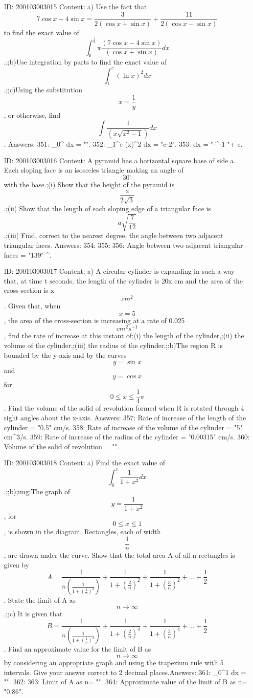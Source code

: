 \documentclass{article}
\begin{document}
ID: 200103003015
Content:
a) Use the fact that $$7\cos x - 4\sin x = \frac{3}{2( \cos x + \sin x )} + \frac{11}{2( \cos x - \sin x )}$$ to find the exact value of  $$\int_0^\frac{1}{2}\pi \frac{(7\cos x - 4\sin x)}{(\cos x + \sin x)} dx$$.;;b)Use integration by parts to find the exact value of $$\int_1^e  (\ln x) ^2 dx $$.;;c)Using the substitution  $$x = \frac{1}{y}$$, or otherwise, find $$\int \frac{1}{(x\sqrt {x^2  - 1})}dx $$. Answers:
351: \int_0^{}  dx = "".
352: \int_1^e (\ln x)^2 dx = "e-2".
353: \int {} dx = "-\sin^{-1} {}"+ c.

ID: 200103003016
Content:
A pyramid has a horizontal square base of side a. Each sloping face is an isosceles triangle making an angle of  $$30^{\circ}$$ with the base.;(i) Show that the height of the pyramid is  $$\frac{a}{2\sqrt 3}$$.;(ii) Show that the length of each sloping edge of a triangular face is  $$a\sqrt {\frac{7}{12}} $$.;(iii) Find, correct to the nearest degree, the angle between two adjacent triangular faces.  Answers:
354: 
355: 
356: Angle between two adjacent triangular faces = "139" ^{\circ}.

ID: 200103003017
Content:
a) A circular cylinder is expanding in such a way that, at time t seconds, the length of the cylinder is 20x cm and the area of the cross-section is  x $$cm^2$$. Given that, when $$x = 5$$, the area of the cross-section is increasing at a rate of 0.025 $$cm^2 s^{-1}$$, find the rate of increase at this instant of;(i) the length of the cylinder,;(ii) the volume of the cylinder,;(iii) the radius of the cylinder.;;b)The region R is bounded by the y-axis and by the curves $$y = \sin{x}$$ and $$y = \cos{x}$$ for  \[0 \le x \le \frac{1}{4}\pi\]. Find the volume of the solid of revolution formed when R is rotated through 4 right angles about the x-axis. Answers:
357: Rate of increase of the length of the cylinder = "0.5" cm/s.
358: Rate of increase of the volume of the cylinder = "5" cm^3/s.
359: Rate of increase of the radius of the cylinder = "0.00315" cm/s.
360: Volume of the solid of revolution = "".

ID: 200103003018
Content:
a) Find the exact value of  $$\int_0^1 \frac{1}{1 + x^2}dx $$.;;b);img;The graph of  $$y = \frac{1}{1 + x^2}$$, for  $$0 \le x \le 1$$, is shown in the diagram. Rectangles, each of width  $$\frac{1}{n}$$, are drawn under the curve. Show that the total area A of all n rectangles is given by $$A = \frac{1}{n\left(\frac{1}{1 + (\frac{1}{n})^2}\right)} + \frac{1}{1 + (\frac{2}{n})^2} + \frac{1}{1 + (\frac{3}{n})^2} + ... + \frac{1}{2}$$. State the limit of A as  $$n \to \infty $$.;;c) It is given that $$B = \frac{1}{n\left(\frac{1}{1 + (\frac{1}{n})^4}\right)} + \frac{1}{1 + (\frac{2}{n})^4}+ \frac{1}{1 + (\frac{3}{n})^4}+ ... + \frac{1}{2}$$. Find an approximate value for the limit of B as  $$n \to \infty $$ by considering an appropriate graph and using the trapezium rule with 5 intervals. Give your answer correct to 2 decimal places.Answers:
361: \int_0^1  dx = "".
362: 
363: Limit of A as n\rightarrow\infty = "".
364: Approximate value of the limit of B as n\rightarrow\infty = "0.86".
\end{document}
